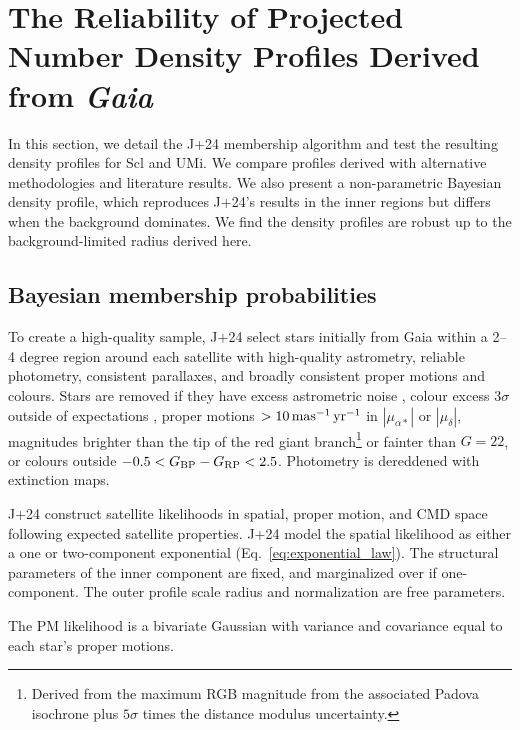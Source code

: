 \chapter{\texorpdfstring{The Reliability of Projected Number Density
Profiles Derived from
\emph{Gaia}}{The Reliability of Projected Number Density Profiles Derived from Gaia}}\label{sec:extra_density}

In this section, we detail the J+24 membership algorithm and test the
resulting density profiles for Scl and UMi. We compare profiles derived
with alternative methodologies and literature results. We also present a
non-parametric Bayesian density profile, which reproduces J+24's results
in the inner regions but differs when the background dominates. We find
the density profiles are robust up to the background-limited radius
derived here.

\section{Bayesian membership
probabilities}\label{bayesian-membership-probabilities}

To create a high-quality sample, J+24 select stars initially from Gaia
within a 2--4 degree region around each satellite with high-quality
astrometry, reliable photometry, consistent parallaxes, and broadly
consistent proper motions and colours. Stars are removed if they have
excess astrometric noise \citep[\({\rm ruwe} > 1.3\),
see][]{lindegren+2021}, colour excess \(3\sigma\) outside of
expectations \citep[from][]{riello+2021}, proper motions \(>10\,{\rm mas^{-1}\,yr^{-1}}\)
in \(|\mu_{\alpha*}|\) or \(|\mu_\delta|\), magnitudes brighter than the
tip of the red giant branch\footnote{Derived from the maximum RGB
  magnitude from the associated Padova isochrone plus
  \(5\sigma\)\hspace{0pt} times the distance modulus uncertainty.} or
fainter than \(G=22\), or colours outside
\(-0.5 < G_{\rm BP} - G_{\rm RP} <  2.5\). Photometry is dereddened with
\citet{schlegel+finkbeiner+davis1998} extinction maps.

J+24 construct satellite likelihoods in spatial, proper motion, and CMD
space following expected satellite properties. J+24 model the spatial
likelihood as either a one or two-component exponential
(Eq.~\ref{eq:exponential_law}). The structural parameters of the inner
component are fixed, and marginalized over if one-component. The outer
profile scale radius and normalization are free parameters.

The PM likelihood is a bivariate Gaussian with variance and covariance
equal to each star's proper motions.

